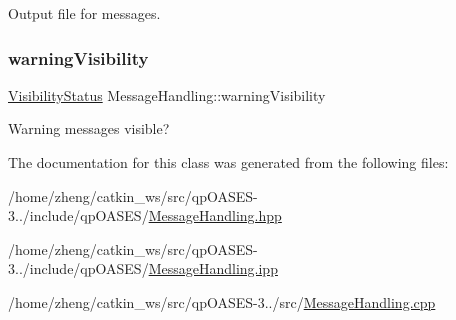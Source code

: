 Output file for messages. \mbox{\label{class_message_handling_af715e377af244418a8003b172c8bdf91}} 
\subsubsection{\texorpdfstring{warning\+Visibility}{warningVisibility}}
{\footnotesize\ttfamily \hyperlink{_types_8hpp_a36503475bb1fea0a7fd7087259ee63c1}{Visibility\+Status} Message\+Handling\+::warning\+Visibility\hspace{0.3cm}{\ttfamily [protected]}}

Warning messages visible? 

The documentation for this class was generated from the following files\+:\begin{DoxyCompactItemize}
\item 
/home/zheng/catkin\+\_\+ws/src/qp\+O\+A\+S\+E\+S-\/3../include/qp\+O\+A\+S\+E\+S/\hyperlink{_message_handling_8hpp}{Message\+Handling.\+hpp}\item 
/home/zheng/catkin\+\_\+ws/src/qp\+O\+A\+S\+E\+S-\/3../include/qp\+O\+A\+S\+E\+S/\hyperlink{_message_handling_8ipp}{Message\+Handling.\+ipp}\item 
/home/zheng/catkin\+\_\+ws/src/qp\+O\+A\+S\+E\+S-\/3../src/\hyperlink{_message_handling_8cpp}{Message\+Handling.\+cpp}\end{DoxyCompactItemize}
